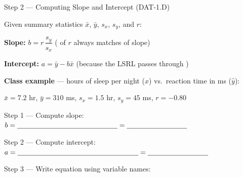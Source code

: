 \documentclass[10pt]{article}
\begin{document}
\vspace{0.1in}

\begin{notesbox}{Step 2 --- Computing Slope and Intercept (DAT-1.D)}
\small

\noindent Given summary statistics $\bar{x}$, $\bar{y}$, $s_x$, $s_y$, and $r$:

\vspace{6pt}
\textbf{Slope:} \quad $b = r\,\dfrac{s_y}{s_x}$ \quad\quad (\blank{3.5cm} of $r$ always matches \blank{2.5cm} of slope)

\vspace{8pt}
\textbf{Intercept:} \quad $a = \bar{y} - b\bar{x}$ \quad\quad (because the LSRL passes through \blank{3cm})

\vspace{10pt}
\textbf{Class example} --- hours of sleep per night ($x$) vs.\ reaction time in ms ($\hat{y}$):

\vspace{4pt}
$\bar{x} = 7.2$ hr, \; $\bar{y} = 310$ ms, \; $s_x = 1.5$ hr, \; $s_y = 45$ ms, \; $r = -0.80$

\vspace{6pt}
Step 1 --- Compute slope: \quad $b = \blank{5cm} = \blank{3cm}$

\vspace{6pt}
Step 2 --- Compute intercept: \quad $a = \blank{6cm} = \blank{3cm}$

\vspace{6pt}
Step 3 --- Write equation using variable names:

\vspace{4pt}
\hspace{1.5cm} \blank{10cm}

\end{notesbox}

\vspace{0.1in}
\end{document}
